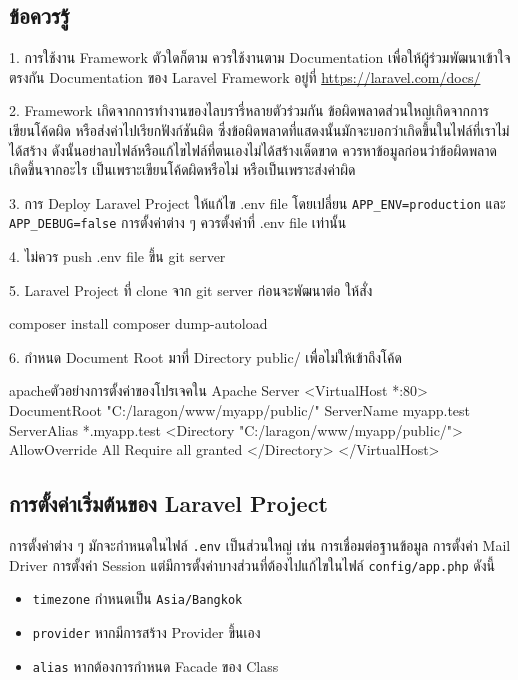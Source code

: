 \subsection{ข้อควรรู้}
1. การใช้งาน Framework ตัวใดก็ตาม ควรใช้งานตาม Documentation เพื่อให้ผู้ร่วมพัฒนาเข้าใจตรงกัน
Documentation ของ Laravel Framework อยู่ที่ \href{https://laravel.com/docs/}{https://laravel.com/docs/}

2. Framework เกิดจากการทำงานของไลบรารี่หลายตัวร่วมกัน ข้อผิดพลาดส่วนใหญ่เกิดจากการเขียนโค้ดผิด 
หรือส่งค่าไปเรียกฟังก์ชันผิด ซึ่งข้อผิดพลาดที่แสดงนั้นมักจะบอกว่าเกิดขึ้นในไฟล์ที่เราไม่ได้สร้าง 
ดังนั้นอย่าลบไฟล์หรือแก้ไขไฟล์ที่ตนเองไม่ได้สร้างเด็ดขาด ควรหาข้อมูลก่อนว่าข้อผิดพลาดเกิดขึ้นจากอะไร 
เป็นเพราะเขียนโค้ดผิดหรือไม่ หรือเป็นเพราะส่งค่าผิด

3. การ Deploy Laravel Project ให้แก้ไข .env file โดยเปลี่ยน \texttt{APP_ENV=production} 
และ \texttt{APP_DEBUG=false} การตั้งค่าต่าง ๆ ควรตั้งค่าที่ .env file เท่านั้น

4. ไม่ควร push .env file ขึ้น git server

5. Laravel Project ที่ clone จาก git server ก่อนจะพัฒนาต่อ ให้สั่ง
\begin{cli}{}
    composer install
    composer dump-autoload
\end{cli}

6. กำหนด Document Root มาที่ Directory public/ เพื่อไม่ให้เข้าถึงโค้ด
\begin{code}{apache}{ตัวอย่างการตั้งค่าของโปรเจคใน Apache Server}{}
    <VirtualHost *:80> 
        DocumentRoot "C:/laragon/www/myapp/public/"
        ServerName myapp.test
        ServerAlias *.myapp.test
        <Directory "C:/laragon/www/myapp/public/">
            AllowOverride All
            Require all granted
        </Directory>
    </VirtualHost>
\end{code}

\subsection{การตั้งค่าเริ่มต้นของ Laravel Project}
การตั้งค่าต่าง ๆ มักจะกำหนดในไฟล์ \texttt{.env} เป็นส่วนใหญ่ เช่น การเชื่อมต่อฐานข้อมูล 
การตั้งค่า Mail Driver การตั้งค่า Session แต่มีการตั้งค่าบางส่วนที่ต้องไปแก้ไขในไฟล์ 
\texttt{config/app.php} ดังนี้
\begin{itemize}
    \item \texttt{timezone} กำหนดเป็น \texttt{Asia/Bangkok}
    \item \texttt{provider} หากมีการสร้าง Provider ขึ้นเอง
    \item \texttt{alias} หากต้องการกำหนด Facade ของ Class
\end{itemize}